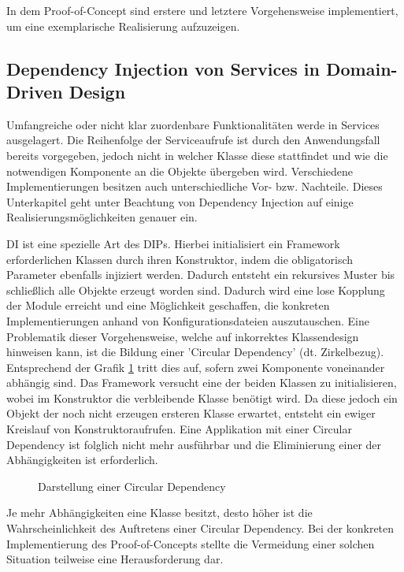 In dem Proof-of-Concept sind erstere und letztere Vorgehensweise implementiert, um eine exemplarische Realisierung aufzuzeigen. 

\subsection{Dependency Injection von Services in Domain-Driven Design}

Umfangreiche oder nicht klar zuordenbare Funktionalitäten werde in Services ausgelagert. Die Reihenfolge der Serviceaufrufe ist durch den Anwendungsfall bereits vorgegeben, jedoch nicht in welcher Klasse diese stattfindet und wie die notwendigen Komponente an die Objekte übergeben wird. Verschiedene Implementierungen besitzen auch unterschiedliche Vor- bzw. Nachteile. Dieses Unterkapitel geht unter Beachtung von Dependency Injection auf einige Realisierungsmöglichkeiten genauer ein. 

\Gls{DI} ist eine spezielle Art des \acrlong{DIP}s. Hierbei initialisiert ein Framework erforderlichen Klassen durch ihren Konstruktor, indem die obligatorisch Parameter ebenfalls injiziert werden. Dadurch entsteht ein rekursives Muster bis schließlich alle Objekte erzeugt worden sind. Dadurch wird eine lose Kopplung der Module erreicht und eine Möglichkeit geschaffen, die konkreten Implementierungen anhand von Konfigurationsdateien auszutauschen. Eine Problematik dieser Vorgehensweise, welche auf inkorrektes Klassendesign hinweisen kann, ist die Bildung einer 'Circular Dependency' (dt. Zirkelbezug). Entsprechend der Grafik \ref{fig:circulardependency} tritt dies auf, sofern zwei Komponente voneinander abhängig sind. Das Framework versucht eine der beiden Klassen zu initialisieren, wobei im Konstruktor die verbleibende Klasse benötigt wird. Da diese jedoch ein Objekt der noch nicht erzeugen ersteren Klasse erwartet, entsteht ein ewiger Kreislauf von Konstruktoraufrufen. Eine Applikation mit einer Circular Dependency ist folglich nicht mehr ausführbar und die Eliminierung einer der Abhängigkeiten ist erforderlich. 

\begin{figure}[htbp]
	\centering
	\footnotesize
	
	\caption{Darstellung einer Circular Dependency}
	\label{fig:circulardependency}
\end{figure}

Je mehr Abhängigkeiten eine Klasse besitzt, desto höher ist die Wahrscheinlichkeit des Auftretens einer Circular Dependency. Bei der konkreten Implementierung des Proof-of-Concepts stellte die Vermeidung einer solchen Situation teilweise eine Herausforderung dar.


